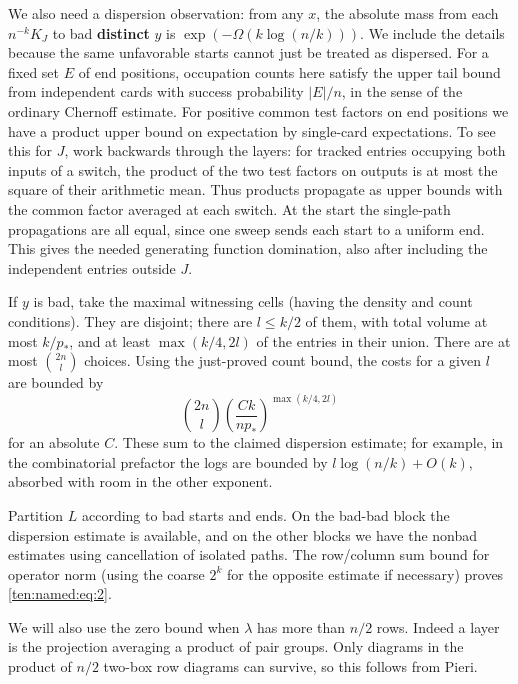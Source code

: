 We also need a dispersion observation: from any \(x\), the absolute mass from each \(n^{-k}K_J\) to bad \textbf{distinct} \(y\) is \(\exp(-\Omega(k\log(n/k)))\). We include the details because the same unfavorable starts cannot just be treated as dispersed. For a fixed set \(E\) of end positions, occupation counts here satisfy the upper tail bound from independent cards with success probability \(|E|/n\), in the sense of the ordinary Chernoff estimate. For positive common test factors on end positions we have a product upper bound on expectation by single-card expectations. To see this for \(J\), work backwards through the layers: for tracked entries occupying both inputs of a switch, the product of the two test factors on outputs is at most the square of their arithmetic mean. Thus products propagate as upper bounds with the common factor averaged at each switch. At the start the single-path propagations are all equal, since one sweep sends each start to a uniform end. This gives the needed generating function domination, also after including the independent entries outside \(J\).

If \(y\) is bad, take the maximal witnessing cells (having the density and count conditions). They are disjoint; there are \(l\le k/2\) of them, with total volume at most \(k/p_*\), and at least \(\max(k/4,2l)\) of the entries in their union. There are at most \(\binom{2n}{l}\) choices. Using the just-proved count bound, the costs for a given \(l\) are bounded by
\[
 \binom{2n}{l}
 \left(\frac{C k}{n p_*}\right)^{\max(k/4,2l)}
\]
for an absolute \(C\). These sum to the claimed dispersion estimate; for example, in the combinatorial prefactor the logs are bounded by \(l\log(n/k)+O(k)\), absorbed with room in the other exponent.

Partition \(L\) according to bad starts and ends. On the bad-bad block the dispersion estimate is available, and on the other blocks we have the nonbad estimates using cancellation of isolated paths. The row/column sum bound for operator norm (using the coarse \(2^k\) for the opposite estimate if necessary) proves \eqref{ten:named:eq:2}.

We will also use the zero bound when \(\lambda\) has more than \(n/2\) rows. Indeed a layer is the projection averaging a product of pair groups. Only diagrams in the product of \(n/2\) two-box row diagrams can survive, so this follows from Pieri.

